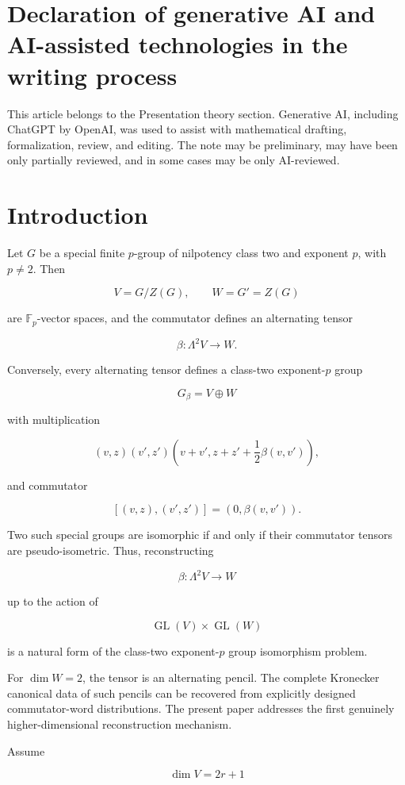 \documentclass[11pt]{article}
\begin{document}
\section*{Declaration of generative AI and AI-assisted technologies in the writing process}
This article belongs to the Presentation theory section. Generative AI, including ChatGPT by \mbox{OpenAI}, was used to assist with mathematical drafting, formalization, review, and editing. The note may be preliminary, may have been only partially reviewed, and in some cases may be only AI-reviewed.

\section{Introduction}

Let $G$ be a special finite $p$-group of nilpotency class two and exponent $p$, with $p\neq2$. Then

\[
V=G/Z(G),\qquad W=G'=Z(G)
\]

are $\mathbb F_p$-vector spaces, and the commutator defines an alternating tensor

\[
\beta:\Lambda^2V\to W.
\]

Conversely, every alternating tensor defines a class-two exponent-$p$ group

\[
G_\beta=V\oplus W
\]

with multiplication

\[
(v,z)(v',z')
\left(v+v',z+z'+\frac12\beta(v,v')\right),
\]

and commutator

\[
[(v,z),(v',z')]=(0,\beta(v,v')).
\]

Two such special groups are isomorphic if and only if their commutator tensors are pseudo-isometric. Thus, reconstructing

\[
\beta:\Lambda^2V\to W
\]

up to the action of

\[
\operatorname{GL}(V)\times \operatorname{GL}(W)
\]

is a natural form of the class-two exponent-$p$ group isomorphism problem.

For $\dim W=2$, the tensor is an alternating pencil. The complete Kronecker canonical data of such pencils can be recovered from explicitly designed commutator-word distributions. The present paper addresses the first genuinely higher-dimensional reconstruction mechanism.

Assume

\[
\dim V=2r+1
\]
\end{document}

